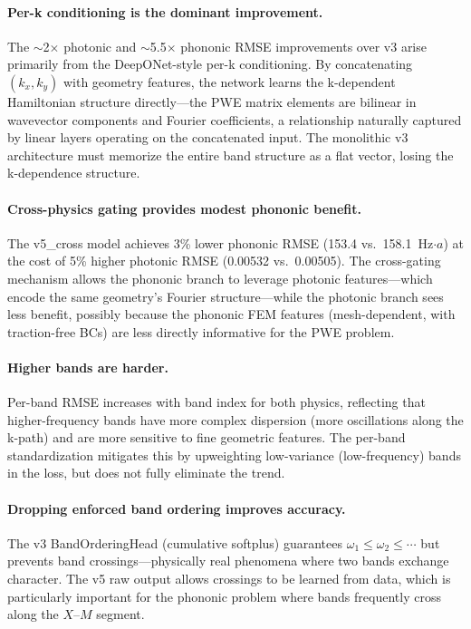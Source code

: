 \documentclass[11pt]{article}
\begin{document}
\paragraph{Per-k conditioning is the dominant improvement.} The $\sim$2$\times$ photonic and $\sim$5.5$\times$ phononic RMSE improvements over v3 arise primarily from the DeepONet-style per-k conditioning. By concatenating $(k_x, k_y)$ with geometry features, the network learns the k-dependent Hamiltonian structure directly---the PWE matrix elements are bilinear in wavevector components and Fourier coefficients, a relationship naturally captured by linear layers operating on the concatenated input. The monolithic v3 architecture must memorize the entire band structure as a flat vector, losing the k-dependence structure.

\paragraph{Cross-physics gating provides modest phononic benefit.} The v5\_cross model achieves 3\% lower phononic RMSE (153.4 vs.\ 158.1~Hz$\cdot a$) at the cost of 5\% higher photonic RMSE (0.00532 vs.\ 0.00505). The cross-gating mechanism allows the phononic branch to leverage photonic features---which encode the same geometry's Fourier structure---while the photonic branch sees less benefit, possibly because the phononic FEM features (mesh-dependent, with traction-free BCs) are less directly informative for the PWE problem.

\paragraph{Higher bands are harder.} Per-band RMSE increases with band index for both physics, reflecting that higher-frequency bands have more complex dispersion (more oscillations along the k-path) and are more sensitive to fine geometric features. The per-band standardization mitigates this by upweighting low-variance (low-frequency) bands in the loss, but does not fully eliminate the trend.

\paragraph{Dropping enforced band ordering improves accuracy.} The v3 BandOrderingHead (cumulative softplus) guarantees $\omega_1 \leq \omega_2 \leq \cdots$ but prevents band crossings---physically real phenomena where two bands exchange character. The v5 raw output allows crossings to be learned from data, which is particularly important for the phononic problem where bands frequently cross along the $X$--$M$ segment.
\end{document}
